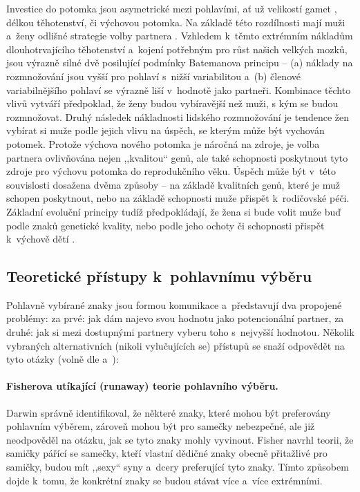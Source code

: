 \documentclass[a4paper, 12pt, notitlepage, oneside, numbers=noenddot]{report}
\begin{document}
Investice do potomka jsou asymetrické mezi pohlavími, ať už velikostí
gamet \citep{Dawkins1998}, délkou těhotenství, či výchovou potomka.
Na základě této rozdílnosti mají muži a~ženy odlišné strategie volby
partnera \citep{BussSchmitt1993}.  Vzhledem k~těmto ex\-trém\-ním
nákladům dlouhotrvajícího těhotenství a~kojení potřebným pro růst
našich velkých mozků, jsou výrazně silné dvě posilující podmínky
Batemanova principu -- (a) náklady na roz\-mno\-žo\-vá\-ní jsou vyšší
pro pohlaví s~nižší variabilitou a~(b) členové variabilnějšího pohlaví
se výrazně liší v~hodnotě jako partneři.  Kombinace těchto vlivů
vytváří předpoklad, že ženy budou vybíravější než muži, s kým se budou
rozmnožovat.  Druhý následek nákladnosti lidského rozmnožování je
tendence žen vybírat si muže podle jejich vlivu na úspěch, se kterým
může být vychován potomek.  Protože výchova nového potomka je náročná
na zdroje, je volba partnera ovlivňována nejen ,,kvalitou`` genů, ale
také schopnosti poskytnout tyto zdroje pro výchovu potomka do
reprodukčního věku.  Úspěch může být v~této souvislosti dosažena dvěma
způsoby -- na základě kvalitních genů, které je muž schopen
poskytnout, nebo na základě schopnosti muže přispět k~rodičovské péči.
Základní evoluční principy tudíž předpokládají, že žena si bude volit
muže buď podle znaků genetické kvality, nebo podle jeho ochoty či
schopnosti přispět k~výchově dětí \citep{BarrettDunbarLycett2007}.

\subsection{Teoretické přístupy k~pohlavnímu výběru}
Pohlavně vybírané znaky jsou formou komunikace a~představují dva
propojené problémy: za prvé: jak dám najevo svou hodnotu jako
potencionální partner, za druhé: jak si mezi dostupnými partnery
vyberu toho s~nejvyšší hodnotou.  Několik vybraných alternativních
(nikoli vylučujících se) přístupů se snaží odpovědět na tyto otázky
(volně dle \citealp{Barber1995} a~\citealp{Ridley2007}):

\paragraph{Fisherova utíkající (runaway) teorie pohlavního výběru.}
Darwin správně identifikoval, že některé znaky, které mohou být
preferovány pohlavním výběrem, zároveň mohou být pro samečky
nebezpečné, ale již neodpověděl na otázku, jak se tyto znaky mohly
vyvinout.  Fisher navrhl teorii, že samičky pářící se samečky, kteří
vlastní dědičné znaky obecně přitažlivé pro samičky, budou mít
,,sexy`` syny a~dcery preferující tyto znaky.  Tímto způsobem dojde
k~tomu, že konkrétní znaky se budou stávat více a~více extrémními.
\end{document}
